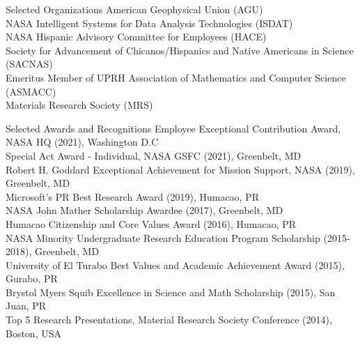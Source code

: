 \documentclass{resume} %
\begin{document}
\begin{rSection}{Selected Organizations}
American Geophysical Union (AGU) \\
NASA Intelligent Systems for Data Analysis Technologies (ISDAT) \\
NASA Hispanic Advisory Committee for Employees (HACE) \\
Society for Advancement of Chicanos/Hispanics and Native Americans in Science (SACNAS) \\
Emeritus Member of UPRH Association of Mathematics and Computer Science (ASMACC) \\
Materials Research Society (MRS) \\
\end{rSection}


\begin{rSection}{Selected Awards and Recognitions}
Employee Exceptional Contribution Award, NASA HQ (2021), Washington D.C \\
Special Act Award - Individual, NASA GSFC (2021), Greenbelt, MD \\
Robert H. Goddard Exceptional Achievement for Mission Support, NASA (2019), Greenbelt, MD \\
Microsoft's PR Best Research Award (2019), Humacao, PR \\
NASA John Mather Scholarship Awardee (2017), Greenbelt, MD \\
Humacao Citizenship and Core Values Award (2016), Humacao, PR \\
NASA Minority Undergraduate Research Education Program Scholarship (2015-2018),  Greenbelt,  MD \\
University of El Turabo Best Values and Academic Achievement Award (2015), Gurabo, PR \\
Brystol Myers Squib Excellence in Science and Math Scholarship (2015), San Juan, PR \\
Top 5 Research Presentations, Material Research Society Conference (2014), Boston, USA \\
\end{rSection}




\end{document}
